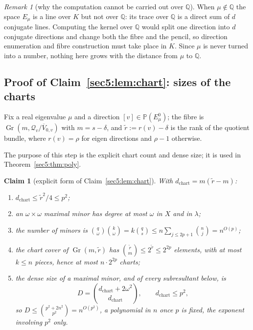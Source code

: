 \documentclass[journal]{IEEEtran}
\theoremstyle{plainn}
\newtheorem{claim}{Claim}
\theoremstyle{remark}
\newtheorem{remark}{Remark}
\newcommand{\Gr}{\operatorname{Gr}}
\begin{document}
\begin{remark}[why the computation cannot be carried out over $\mathbb{Q}$]\label{appBC:rem:mustK}
When $\mu\notin\mathbb{Q}$ the space $E_\mu$ is a line over $K$ but not over $\mathbb{Q}$: its trace
over $\mathbb{Q}$ is a direct sum of $d$ conjugate lines. Computing the kernel over $\mathbb{Q}$ would
split one direction into $d$ conjugate directions and change both the fibre and the pencil, so
direction enumeration and fibre construction must take place in $K$. Since $\mu$ is never turned into a
number, nothing here grows with the distance from $\mu$ to $\mathbb{Q}$.
\end{remark}


\subsection{Proof of Claim~\ref{sec5:lem:chart}: sizes of the charts}\label{appBC:sub:chart}


Fix a real eigenvalue $\mu$ and a direction $[v]\in\mathbb{P}(E_\mu^0)$; the fibre is
$\Gr(m,\mathcal{Q}_v/\overline{V}_{0,v})$ with $m=s-\delta$, and $\widetilde r:=r(v)-\delta$ is the
rank of the quotient bundle, where $r(v)=\rho$ for eigen directions and $\rho-1$ otherwise.


The purpose of this step is the explicit chart count and dense size; it is used in
Theorem~\ref{sec5:thm:poly}.

\begin{claim}[explicit form of Claim~\ref{sec5:lem:chart}]\label{appBC:lem:chart}\label{appBC:rem:poly}
With $d_{\mathrm{chart}}=m(\widetilde r-m)$:
\begin{enumerate}[label=(\roman*),leftmargin=*]
\item $d_{\mathrm{chart}}\le\widetilde r^{2}/4\le p^{2}$;
\item an $\omega\times\omega$ maximal minor has degree at most $\omega$ in $X$ and in $\lambda$;
\item the number of minors is
$\binom q\omega\binom k\omega=k\binom qs\le n\sum_{j\le2p+1}\binom nj=n^{O(p)}$;
\item the chart cover of $\Gr(m,\widetilde r)$ has $\binom{\widetilde r}{m}\le2^{\widetilde r}\le2^{2p}$
elements, with at most $k\le n$ pieces, hence at most $n\cdot2^{2p}$ charts;
\item the dense size of a maximal minor, and of every subresultant below, is
\begin{equation}\label{appBC:eq:denseminor}
D=\binom{d_{\mathrm{chart}}+2\omega^{2}}{d_{\mathrm{chart}}},\qquad d_{\mathrm{chart}}\le p^{2},
\end{equation}
so $D\le\binom{p^{2}+2n^{2}}{p^{2}}=n^{O(p^{2})}$, a polynomial in $n$ once $p$ is fixed, the exponent
involving $p^{2}$ only.
\end{enumerate}
\end{claim}
\end{document}
